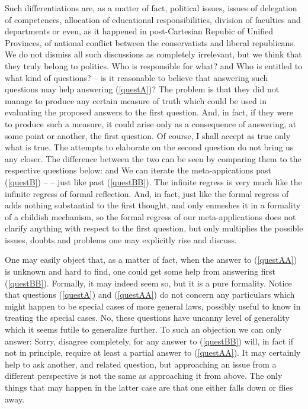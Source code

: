 {Such differentiations are, as a matter of fact, political issues, issues of
delegation of competences, allocation of educational responsibilities, division of
faculties and departments or even, as it happened in
post-Cartesian Repubic of Unified Provinces, of national conflict between the
conservatists and liberal republicans.
We do not dismiss all such discussions as completely irrelevant, but we think
that they truly belong to politics. Who is responsible for what? and Who is
entitled to what kind of questions? -- is it reasonable to believe that
answering such questions may help answering (\ref{questA})? 
The problem is that they did not
manage to produce any certain measure of truth which could be used in evaluating
the proposed answers to the first question. And, in fact, if they were to
produce such a measure, it could arise only as a consequence of answering, at some
point or another, the first question. Of course, I shall accept as true only
what is true. The attempts to elaborate on the second question do not bring us
any closer. The difference between the two can be seen by comparing them to the
respective questions below:
and
We can iterate the meta-appications past (\ref{questB}) --  -- just like past
(\ref{questBB}). The infinite regress is very much like the infinite
regress of formal reflection. And, in fact, just like the formal regress of  adds nothing substantial to the first thought, and only
enmeshes it in a  formality of a childish mechanism, so the formal regress
of our meta-applications does not clarify anything with respect to the first
question, but only multiplies the possible issues, doubts and problems one may
explicitly rise and discuss.

One may easily object that, as a matter of fact, when the answer to
(\ref{questAA}) is unknown and hard to find, one could get some help from
answering first (\ref{questBB}). Formally, it may indeed seem so, but it is a
pure formality.  Notice that questions (\ref{questA}) and (\ref{questAA}) do not
concern any particulars which 
might happen to be special cases of more general laws, possibly useful to know
in treating the special cases. No, these questions have uncanny level of
generality which it seems futile to generalize further.  To such an objection we
can only answer: Sorry, disagree completely, for any answer to (\ref{questBB})
will, in fact if not in principle, 
require at least a partial answer to (\ref{questAA}). It may certainly help to ask
another, and related question, but approaching an issue from a different
perspective is not the same as approaching it from above. The only things that
may happen in the latter case are that one either falls down or flies away.


}
